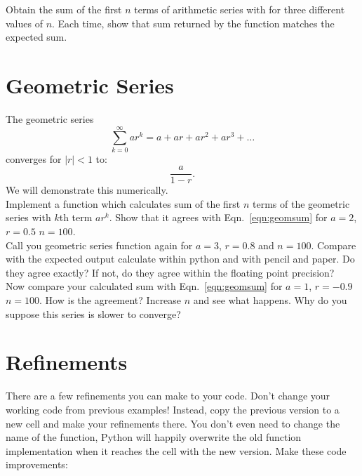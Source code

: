 \plot Obtain the sum of the first $n$ terms of arithmetic series with
 for three different values of $n$.  Each time,
show that sum returned by the function matches the expected sum.

\section{Geometric Series}
\label{sec:geom}

The geometric series
\begin{displaymath}
  \sum_{k=0}^{\infty} a r^k = a + ar + ar^2 + ar^3 + \ldots
\end{displaymath}
converges for $|r| < 1$ to:
\begin{equation} \label{eqn:geomsum}
  \frac{a}{1-r}.
\end{equation}
We will demonstrate this numerically.\\

\plot Implement a function  which calculates sum of the first $n$ terms of the geometric series with $k$th term $a r^k$.  Show that it agrees with Eqn.~\ref{eqn:geomsum} for $a=2$, $r=0.5$  $n=100$.
\\

\plot Call you geometric series function again for $a=3$, $r=0.8$ and $n=100$.  Compare with the expected output calculate within python and with pencil and paper.  Do they agree exactly?  If not, do they agree within the floating point precision?
\\

\plot Now compare your calculated sum with Eqn.~\ref{eqn:geomsum} for $a=1$, $r=-0.9$  $n=100$.  How is the agreement?  Increase $n$ and see what happens.  Why do you suppose this series is slower to converge?\\

\section{Refinements}

There are a few refinements you can make to your code.  Don't change
your working code from previous examples!  Instead, copy the previous
version to a new cell and make your refinements there.  You don't even
need to change the name of the function, Python will happily overwrite
the old function implementation when it reaches the cell with the new
version.  Make these code improvements:\\

